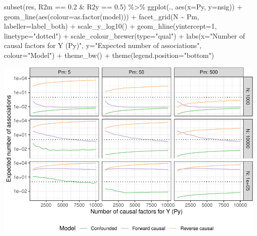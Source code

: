 \documentclass[
]{article}
\newenvironment{Shaded}{\begin{snugshade}}{\end{snugshade}}
\newcommand{\AttributeTok}[1]{\textcolor[rgb]{0.77,0.63,0.00}{#1}}
\newcommand{\DecValTok}[1]{\textcolor[rgb]{0.00,0.00,0.81}{#1}}
\newcommand{\FloatTok}[1]{\textcolor[rgb]{0.00,0.00,0.81}{#1}}
\newcommand{\FunctionTok}[1]{\textcolor[rgb]{0.00,0.00,0.00}{#1}}
\newcommand{\NormalTok}[1]{#1}
\newcommand{\SpecialCharTok}[1]{\textcolor[rgb]{0.00,0.00,0.00}{#1}}
\newcommand{\StringTok}[1]{\textcolor[rgb]{0.31,0.60,0.02}{#1}}
\let\origfigure\figure
\let\endorigfigure\endfigure
\renewenvironment{figure}[1][2] {
    \expandafter\origfigure\expandafter[H]
} {
    \endorigfigure
}
\begin{document}
\begin{Shaded}
\begin{Highlighting}[]
\FunctionTok{subset}\NormalTok{(res, R2m }\SpecialCharTok{==} \FloatTok{0.2} \SpecialCharTok{\&}\NormalTok{ R2y }\SpecialCharTok{==} \FloatTok{0.5}\NormalTok{) }\SpecialCharTok{\%\textgreater{}\%}
\FunctionTok{ggplot}\NormalTok{(., }\FunctionTok{aes}\NormalTok{(}\AttributeTok{x=}\NormalTok{Py, }\AttributeTok{y=}\NormalTok{nsig)) }\SpecialCharTok{+}
  \FunctionTok{geom\_line}\NormalTok{(}\FunctionTok{aes}\NormalTok{(}\AttributeTok{colour=}\FunctionTok{as.factor}\NormalTok{(model))) }\SpecialCharTok{+}
  \FunctionTok{facet\_grid}\NormalTok{(N }\SpecialCharTok{\textasciitilde{}}\NormalTok{ Pm, }\AttributeTok{labeller=}\NormalTok{label\_both) }\SpecialCharTok{+}
  \FunctionTok{scale\_y\_log10}\NormalTok{() }\SpecialCharTok{+}
  \FunctionTok{geom\_hline}\NormalTok{(}\AttributeTok{yintercept=}\DecValTok{1}\NormalTok{, }\AttributeTok{linetype=}\StringTok{"dotted"}\NormalTok{) }\SpecialCharTok{+}
  \FunctionTok{scale\_colour\_brewer}\NormalTok{(}\AttributeTok{type=}\StringTok{"qual"}\NormalTok{) }\SpecialCharTok{+}
  \FunctionTok{labs}\NormalTok{(}\AttributeTok{x=}\StringTok{"Number of causal factors for Y (Py)"}\NormalTok{, }
       \AttributeTok{y=}\StringTok{"Expected number of associations"}\NormalTok{, }
       \AttributeTok{colour=}\StringTok{"Model"}\NormalTok{) }\SpecialCharTok{+} 
  \FunctionTok{theme\_bw}\NormalTok{() }\SpecialCharTok{+} 
  \FunctionTok{theme}\NormalTok{(}\AttributeTok{legend.position=}\StringTok{"bottom"}\NormalTok{)}
\end{Highlighting}
\end{Shaded}

\begin{figure}
\centering
\includegraphics{supplementary-note-EWAS-power_files/figure-latex/pwr-to-detect-assoc-fig-1.pdf}
\caption{\label{fig:pwr-to-detect-assoc-fig}Each box represents the expected number of EWAS associations (y-axis, note the log scale) against how multi-factorial the trait is (x-axis) for the given parameters under each of the three causal models. Rows of boxes represent different sample sizes, and columns of boxes represent how multi-factorial the DNAm sites are. The black dotted line depicts the location on the y-axis for detecting a single causal variant, drawn for convenience.}
\end{figure}
\end{document}
